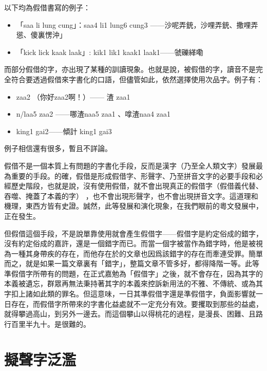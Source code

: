 \documentclass[a5paper, 10pt, openany]{book} %
\begin{document}
以下均為假借書寫的例子：

\begin{itemize}
  \item 「saa li lung cung」：saa4 li1 lung6 cung3 ——沙呢弄銃，沙哩弄銃、撒哩弄慫、傻裏愣沖」
  \item 「kick lick kaak laak」: kik1 lik1 kaak1 laak1——虢礫緙嘞  
\end{itemize}

而部分假借的字，亦出現了某種的訓讀現象。也就是說，被假借的字，讀音不是完全符合要透過假借來字書化的口語，但儘管如此，依然選擇使用次品字。例子有：

\begin{itemize}
\item zaa2 （你好zaa2啊！）—— 渣 zaa1
\item n/laa5 zaa2 ——哪渣naa5 zaa1 、嗱渣naa4 zaa1 
\item king1 gai2——傾計 king1 gai3
\end{itemize}

例子相信還有很多，暫且不詳論。

假借不是一個本質上有問題的字書化手段，反而是漢字（乃至全人類文字）發展最為重要的手段。的確，假借是形成假借字、形聲字、乃至拼音文字的必要手段和必經歷史階段，也就是說，沒有使用假借，就不會出現真正的假借字（假借義代替、吞噬、掩蓋了本義的字） ，也不會出現形聲字，也不會出現拼音文字。這道理和機理，東西方皆有史證。誠然，此等發展和演化現象，在我們眼前的粵文發展中，正在發生。

但假借這個手段，不是說單靠使用就會產生假借字——假借字是約定俗成的錯字，沒有約定俗成的嘉許，還是一個錯字而已。而當一個字被當作為錯字時，他是被視為一種其身帶疾的存在，而他存在於的文章也因爲該錯字的存在而牽連受罪。簡單而之，就是如果一篇文章裏有「錯字」，整篇文章不管多好，都得降階一等。此等準假借字所帶有的問題，在正式嘉勉為「假借字」之後，就不會存在，因為其字的本義被遺忘，群眾再無法秉持著其字的本義來控訴新用法的不雅、不傳統、或為其字扣上諸如此類的罪名。但這意味，一日其準假借字還是準假借字，負面影響就一日存在，而假借字所帶來的字書化益處就不一定充分有效。要攫取到那些的益處，就得攀過高山，到另外一邊去。而這個攀山以得桃花的過程，是漫長、困難、且路行百里半九十。是很難的。
\section{擬聲字泛濫}
\end{document}
